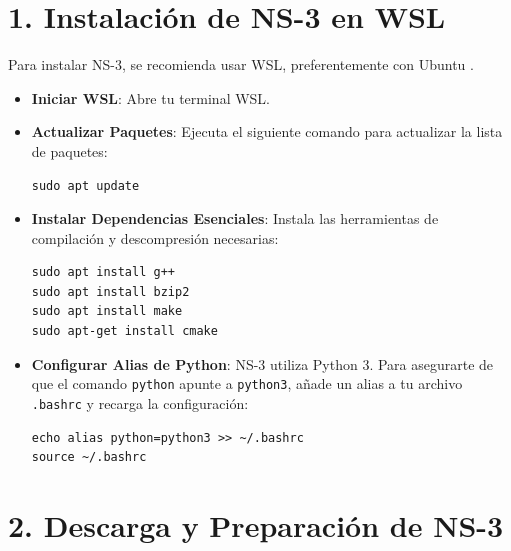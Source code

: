\documentclass{article}
\begin{document}
\section*{\textbf{1. Instalación de NS-3 en WSL}}
Para instalar NS-3, se recomienda usar WSL, preferentemente con Ubuntu .

\begin{itemize}
    \item \textbf{Iniciar WSL}: Abre tu terminal WSL.
    \item \textbf{Actualizar Paquetes}: Ejecuta el siguiente comando para actualizar la lista de paquetes:
    \begin{lstlisting}
sudo apt update
    \end{lstlisting}
    \item \textbf{Instalar Dependencias Esenciales}: Instala las herramientas de compilación y descompresión necesarias:
    \begin{lstlisting}
sudo apt install g++
sudo apt install bzip2
sudo apt install make
sudo apt-get install cmake
    \end{lstlisting}
    \item \textbf{Configurar Alias de Python}: NS-3 utiliza Python 3. Para asegurarte de que el comando \texttt{python} apunte a \texttt{python3}, añade un alias a tu archivo \texttt{.bashrc} y recarga la configuración:
    \begin{lstlisting}
echo alias python=python3 >> ~/.bashrc
source ~/.bashrc
    \end{lstlisting}
\end{itemize}

\section*{\textbf{2. Descarga y Preparación de NS-3}}
\end{document}
